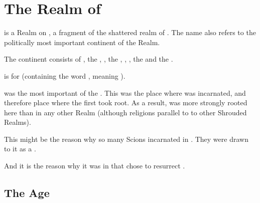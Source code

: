 
\part{The Realm of \Azmith}
\index{\Azmith}
\Azmith{} is a Realm on \Miith{}, a fragment of the shattered realm of \Tembrae. 
The name \quo{\Azmith} also refers to the politically most important continent of the Realm. 

The continent consists of , the , , the , , , the  and the . %

\quo{\Azmith} is  for  (containing the word \quo{\Miith}, meaning ). 

\Azmith was the most important of the . 
This was the place where  was incarnated, and therefore place where the  first took root. 
As a result, \iquin was more strongly rooted here than in any other Realm (although religions parallel to   to other Shrouded Realms). 

This might be the reason why so many Scions incarnated in \Azmith. 
They were drawn to it as a . 

And it is the reason why it was in \Azmith{} that \Secherdamon{} chose to resurrect \Nithdornazsh. 








































\chapter{The \Human Age}















